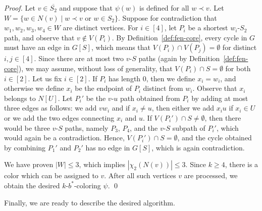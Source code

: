 \documentclass[runningheads, envcountsame]{llncs}
\newcommand{\sep}{\;|\;}
\begin{document}
\begin{proof}
Let $v \in \overline{S_2}$ and suppose that $\psi(w)$ is defined for all $w \prec v$.
Let $W = \{w \in N(v) \sep w \prec v$ or $w \in S_2\}$.
Suppose for contradiction that $w_1, w_2, w_3, w_4 \in W$ are distinct vertices.
For $i \in [4]$, let $P_i$ be a shortest $w_i$-$S_2$ path, and observe that $v \notin V(P_i)$.
By Definition~\ref{def:fen-core}, every cycle in $G$ must have an edge in $G[S]$, which means that $V(P_i) \cap V(P_j) = \emptyset$ for distinct $i,j\in [4]$.
Since there are at most two $v$-$S$ paths (again by Definition~\ref{def:fen-core}), we may assume, without loss of generality, that $V(P_i) \cap S = \emptyset$ for both $i \in [2]$.
Let us fix $i \in [2]$.
If $P_i$ has length 0, then we define $x_i = w_i$, and otherwise we define $x_i$ be the endpoint of $P_i$ distinct from $w_i$. Observe that $x_i$ belongs to $N[U]$.
Let $P_i'$ be the $v$-$u$ path obtained from $P_i$ by adding at most three edges as follows: we add $vw_i$ and if $x_i \ne u$, then either we add $x_iu$ if $x_i \in U$ or we add the two edges connecting $x_i$ and $u$.
If $V(P_i') \cap S \ne \emptyset$, then there would be three $v$-$S$ paths, namely $P_3$, $P_4$, and the $v$-$S$ subpath of $P_i'$, which would again be a contradiction.
Hence, $V(P_i') \cap S = \emptyset$, and the cycle obtained by combining $P_1'$ and $P_2'$ has no edge in $G[S]$, which is again contradiction.

We have proven $|W| \le 3$, which implies $|\chi_2(N(v))| \le 3$.
Since $k \ge 4$, there is a color which can be assigned to $v$.
After all such vertices $v$ are processed, we obtain the desired  $k$-$b^*$-coloring $\psi$.
\qed\end{proof}

Finally, we are ready to describe the desired algorithm.
\end{document}
